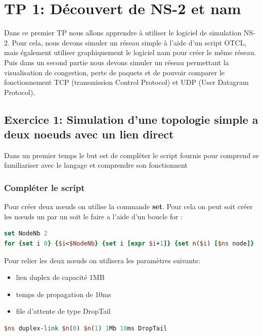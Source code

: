 \documentclass[11pt]{article}
\begin{document}
\pagebreak


\section{TP 1: Découvert de NS-2 et nam}
Dans ce premier TP nous allons apprendre à utiliser le logiciel de simulation NS-2. Pour cela, nous devons simuler un réseau simple à l’aide d’un script OTCL, mais également utiliser graphiquement le logiciel nam pour créer le même réseau. Puis dans un second partie nous devons simuler un réseau permettant la visualisation de congestion, perte de paquets et de pouvoir comparer le fonctionnement TCP (transmission Control Protocol) et UDP (User Datagram Protocol).

\subsection{Exercice 1: Simulation d'une topologie simple a deux noeuds avec un lien direct}

Dans un premier temps le but est de compléter le script fournis pour comprend se familiariser avec le langage et comprendre son fonctionnent

\subsubsection{Compléter le script}
Pour créer deux nœuds on utilise la commande \textbf{set}. Pour cela on peut soit créer les nœuds un par un soit le faire a l'aide d'un boucle for :

\begin{lstlisting}[language=tcl, numbers=none, framexleftmargin=0pt, framextopmargin=0pt, framexbottommargin=0pt]
set NodeNb 2
for {set i 0} {$i<$NodeNb} {set i [expr $i+1]} {set n($i) [$ns node]}
\end{lstlisting}

\noindent %
Pour relier les deux nœuds on utilisera les paramètres suivants:
\begin{itemize}
	\item lien duplex de capacité 1MB
	\item temps de propagation de 10ms
	\item file d'attente de type DropTail
\end{itemize}

\begin{lstlisting}[language=tcl, numbers=none, framexleftmargin=0pt, 	framextopmargin=0pt, framexbottommargin=0pt]
$ns duplex-link $n(0) $n(1) 1Mb 10ms DropTail
\end{lstlisting}
\end{document}
